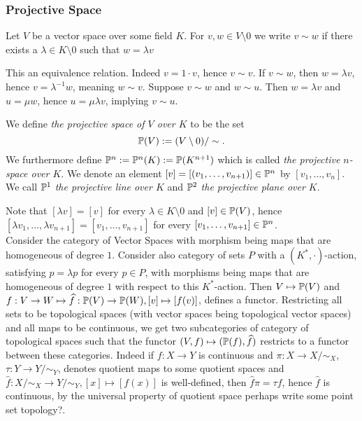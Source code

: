 \subsubsection{Projective Space}
    \begin{definition}\label{ProjectiveEquivalence}
        Let $V$ be a vector space over some field $K$. For $v,w\in V\setminus 0$ we write $v\sim w$ if there exists a $\lambda\in K\setminus 0$ such that $w = \lambda v$
    \end{definition}
    \begin{remark}
        This an equivalence relation. Indeed $v = 1\cdot v$, hence $v\sim v$. If $v\sim w$, then $w =\lambda v$, hence $v= \lambda^{-1}w$, meaning $w\sim v$. Suppose $v\sim w$ and $w\sim u$. Then $w=\lambda v$ and $u = \mu w$, hence $u = \mu\lambda v$, implying $v\sim u$. 
    \end{remark}
    \begin{definition}
        We define \textit{the projective space of $V$ over $K$} to be the set 
        $$\mathbb{P}(V) := (V\setminus 0)/\sim.$$
        We furthermore define $\mathbb{P}^n:=\mathbb{P}^n(K):= \mathbb{P}(K^{n+1})$ which is called \textit{the projective $n$-space over $K$}. We denote an element $[v]=[(v_1,\dots,v_{n+1})]\in \mathbb{P}^n$ by $[v_1,\dots,v_n]$.   We call $\mathbb{P}^1$ \textit{the projective line over $K$} and $\mathbb{P}^2$ \textit{the projective plane over $K$}.   
    \end{definition}
    \begin{remark}
        Note that $[\lambda v]=[v]$ for every $\lambda\in K\setminus 0$ and $[v]\in \mathbb{P}(V)$, hence $[\lambda v_1,\dots,\lambda v_{n+1}]=[v_1,\dots,v_{n+1}]$ for every $[v_1,\dots,v_{n+1}]\in\mathbb{P}^n$.\\
        Consider the category of Vector Spaces with morphism being maps that are homogeneous of degree $1$. Consider also category of sets $P$ with a $(K^\ast,\cdot)$-action, satisfying $p=\lambda p$ for every $p\in P$, with morphisms being maps that are homogeneous of degree $1$ with respect to this $K^\ast$-action. Then $V\mapsto \mathbb{P}(V)$ and $f: V\rightarrow W\mapsto \widehat{f} : \mathbb{P}(V)\rightarrow \mathbb{P}(W), [v]\mapsto [f(v)]$, defines a functor. Restricting all sets to be topological spaces (with vector spaces being topological vector spaces) and all maps to be continuous, we get two subcategories of category of topological spaces such that the functor $(V,f)\mapsto (\mathbb{P}(f),\widehat{f})$ restricts to a functor between these categories. Indeed if $f: X\rightarrow Y$ is continuous and $\pi: X\rightarrow X/\sim_X$, $\tau: Y\rightarrow Y/\sim_Y$, denotes quotient maps to some quotient spaces and $\widehat{f}: X/\sim_X \rightarrow Y/\sim_Y, [x]\mapsto [f(x)]$ is well-defined, then $\widehat{f}\pi = \tau f $, hence $\widehat{f}$ is continuous, by the universal property of quotient space {\large perhaps write some point set topology?}.    
    \end{remark}
